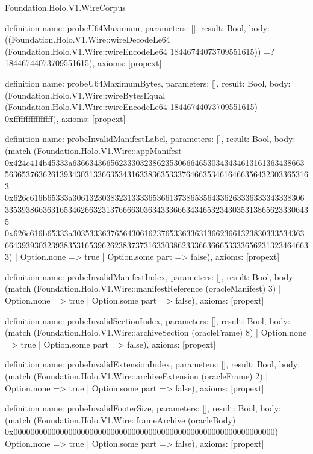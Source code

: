 \begin{lexlean}{Foundation.Holo.V1.WireCorpus}
\begin{semanticmodule}
definition{
  name: probeU64Maximum,
  parameters: [],
  result: Bool,
  body: ((Foundation.Holo.V1.Wire::wireDecodeLe64 (Foundation.Holo.V1.Wire::wireEncodeLe64 18446744073709551615)) =? 18446744073709551615),
  axioms: [propext]
}

definition{
  name: probeU64MaximumBytes,
  parameters: [],
  result: Bool,
  body: (Foundation.Holo.V1.Wire::wireBytesEqual (Foundation.Holo.V1.Wire::wireEncodeLe64 18446744073709551615) 0xffffffffffffffff),
  axioms: [propext]
}

definition{
  name: probeInvalidManifestLabel,
  parameters: [],
  result: Bool,
  body: (match (Foundation.Holo.V1.Wire::appManifest 0x424c414b45333a63663436656233303238623530666465303434346131613634386635636537636261393430313366353431633836353337646635346164663564323033653163 0x626c616b65333a30613230383231333365366137386535643362633363333433383063353938663631653462663231376666303634333666343465323430353138656233306435 0x626c616b65333a30353336376564306162376533633631366236613238303335343636643939303239383531653962623837373163303862333663666533336562313234646633)
    | Option.none => true
    | Option.some part => false),
  axioms: [propext]
}

definition{
  name: probeInvalidManifestIndex,
  parameters: [],
  result: Bool,
  body: (match (Foundation.Holo.V1.Wire::manifestReference (oracleManifest) 3)
    | Option.none => true
    | Option.some part => false),
  axioms: [propext]
}

definition{
  name: probeInvalidSectionIndex,
  parameters: [],
  result: Bool,
  body: (match (Foundation.Holo.V1.Wire::archiveSection (oracleFrame) 8)
    | Option.none => true
    | Option.some part => false),
  axioms: [propext]
}

definition{
  name: probeInvalidExtensionIndex,
  parameters: [],
  result: Bool,
  body: (match (Foundation.Holo.V1.Wire::archiveExtension (oracleFrame) 2)
    | Option.none => true
    | Option.some part => false),
  axioms: [propext]
}

definition{
  name: probeInvalidFooterSize,
  parameters: [],
  result: Bool,
  body: (match (Foundation.Holo.V1.Wire::frameArchive (oracleBody) 0x00000000000000000000000000000000000000000000000000000000000000)
    | Option.none => true
    | Option.some part => false),
  axioms: [propext]
}


\end{semanticmodule}
\end{lexlean}
